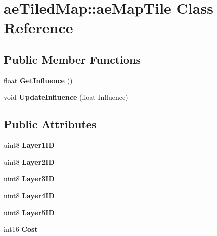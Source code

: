 \hypertarget{classae_tiled_map_1_1ae_map_tile}{}\section{ae\+Tiled\+Map\+:\+:ae\+Map\+Tile Class Reference}
\label{classae_tiled_map_1_1ae_map_tile}
\subsection*{Public Member Functions}
\begin{DoxyCompactItemize}
\item 
float {\bfseries Get\+Influence} ()\hypertarget{classae_tiled_map_1_1ae_map_tile_a6268817476bbdac5f7e99a0069fc4668}{}\label{classae_tiled_map_1_1ae_map_tile_a6268817476bbdac5f7e99a0069fc4668}

\item 
void {\bfseries Update\+Influence} (float Influence)\hypertarget{classae_tiled_map_1_1ae_map_tile_afffcc6ca1d2286fdbc54ab80c570e5ac}{}\label{classae_tiled_map_1_1ae_map_tile_afffcc6ca1d2286fdbc54ab80c570e5ac}

\end{DoxyCompactItemize}
\subsection*{Public Attributes}
\begin{DoxyCompactItemize}
\item 
uint8 {\bfseries Layer1\+ID}\hypertarget{classae_tiled_map_1_1ae_map_tile_a62387a8519724de9f62e84d0efe9dd3c}{}\label{classae_tiled_map_1_1ae_map_tile_a62387a8519724de9f62e84d0efe9dd3c}

\item 
uint8 {\bfseries Layer2\+ID}\hypertarget{classae_tiled_map_1_1ae_map_tile_a15ff7a8a579a2ba768eee80f518cfb1c}{}\label{classae_tiled_map_1_1ae_map_tile_a15ff7a8a579a2ba768eee80f518cfb1c}

\item 
uint8 {\bfseries Layer3\+ID}\hypertarget{classae_tiled_map_1_1ae_map_tile_a317df47e310c38ca0f000f7a33bdf797}{}\label{classae_tiled_map_1_1ae_map_tile_a317df47e310c38ca0f000f7a33bdf797}

\item 
uint8 {\bfseries Layer4\+ID}\hypertarget{classae_tiled_map_1_1ae_map_tile_a62110806e94664bd7bf04b63fea4c325}{}\label{classae_tiled_map_1_1ae_map_tile_a62110806e94664bd7bf04b63fea4c325}

\item 
uint8 {\bfseries Layer5\+ID}\hypertarget{classae_tiled_map_1_1ae_map_tile_a3ef02b2a1938cc238e54df1317a7a68c}{}\label{classae_tiled_map_1_1ae_map_tile_a3ef02b2a1938cc238e54df1317a7a68c}

\item 
int16 {\bfseries Cost}\hypertarget{classae_tiled_map_1_1ae_map_tile_a561879a9ee07bef7c3d8f6cdaf527543}{}\label{classae_tiled_map_1_1ae_map_tile_a561879a9ee07bef7c3d8f6cdaf527543}

\end{DoxyCompactItemize}


